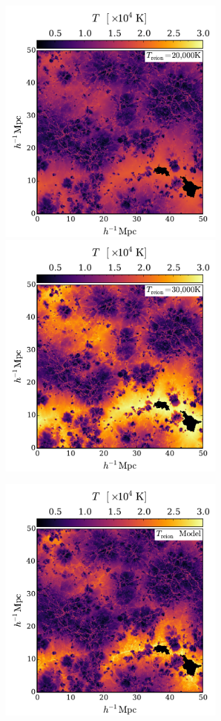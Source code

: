\documentclass[twocolumn]{aastex62}
\begin{document}
\begin{figure}
\centerline{
\includegraphics[width=8.0cm]{fig9a.pdf}
\includegraphics[width=8.0cm]{fig9b.pdf}}
\centerline{
\includegraphics[width=8.0cm]{fig9c.pdf}
}
\end{figure}
\end{document}
